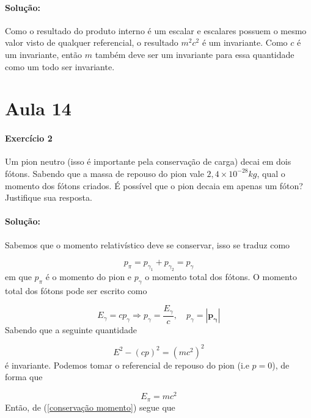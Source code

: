 \documentclass[10pt,a4paper]{article}
\begin{document}
\paragraph{Solução:}  Como o resultado do produto interno é um escalar e escalares possuem o mesmo valor visto de qualquer referencial, o resultado $m^2c^2$ é um invariante. Como $c$ é um invariante, então $m$ também deve ser um invariante para essa quantidade como um todo ser invariante. 


\section*{Aula 14}

\paragraph{Exercício 2} Um pion neutro (isso é importante pela conservação de carga) decai em dois fótons. Sabendo que a massa de repouso do pion vale $2,4\times 10^{-28}\unit{kg}$, qual o momento dos fótons criados. É possível que o pion decaia em apenas um
fóton? Justifique sua resposta.

\paragraph{Solução:} Sabemos que o momento relativístico deve se conservar, isso se traduz como

\begin{equation}\label{conservação momento}
 p_{\pi} = p_{\gamma_1} + p_{\gamma_2} = p_{\gamma}
\end{equation}
em que $p_{\pi}$ é o momento do pion e $p_{\gamma}$ o momento total dos fótons. O momento total dos fótons pode ser escrito como 

\begin{equation}\label{momento foton}
E_{\gamma} = cp_{\gamma} \Rightarrow p_{\gamma} = \frac{E_{\gamma}}{c}, \quad p_{\gamma} = |\mathbf{p_{\gamma}}|
\end{equation}
Sabendo que a seguinte quantidade 

\begin{equation}\label{energia momento}
E^2 - (cp)^2 = (mc^2)^2
\end{equation}
é invariante. Podemos tomar o referencial de repouso do pion (i.e $p =0$), de forma que 

\begin{equation}\label{energia repouso}
E_{\pi} = mc^2
\end{equation}
Então, de (\ref{conservação momento}) segue que
\end{document}
